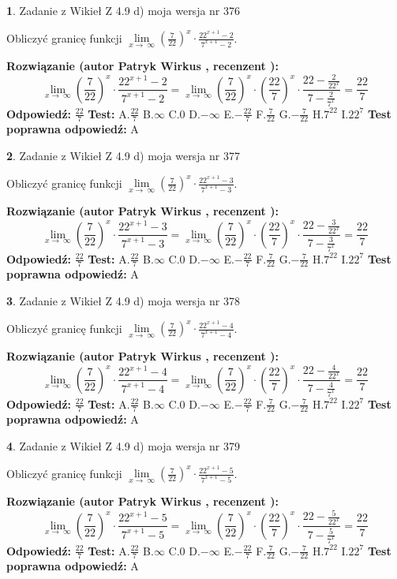 \documentclass[12pt, a4paper]{article}
\theoremstyle{definition} %
\newtheorem{zad}{}
\newcommand{\zadStart}[1]{\begin{zad}#1\newline}
\newcommand{\zadStop}{\end{zad}}
\newcommand{\rozwStart}[2]{\noindent \textbf{Rozwiązanie (autor #1 , recenzent #2): }\newline}
\newcommand{\rozwStop}{\newline}
\newcommand{\odpStart}{\noindent \textbf{Odpowiedź:}\newline}
\newcommand{\odpStop}{\newline}
\newcommand{\testStart}{\noindent \textbf{Test:}\newline}
\newcommand{\testStop}{\newline}
\newcommand{\kluczStart}{\noindent \textbf{Test poprawna odpowiedź:}\newline}
\newcommand{\kluczStop}{\newline}
\begin{document}
\zadStart{Zadanie z Wikieł Z 4.9 d) moja wersja nr 376}


Obliczyć granicę funkcji  $\lim\limits_{x\to\ \infty}(\frac{7}{22})^{x}\cdot\frac{22^{x+1}-2}{7^{x+1}-2}$.
\zadStop
\rozwStart{Patryk Wirkus}{}
$$\lim\limits_{x\to\ \infty}(\frac{7}{22})^{x}\cdot\frac{22^{x+1}-2}{7^{x+1}-2}=\lim\limits_{x\to\ \infty}(\frac{7}{22})^{x}\cdot(\frac{22}{7})^{x} \cdot \frac{22-\frac{2}{22^{x}}}{7-\frac{2}{7^{x}}} = \frac{22}{7}$$
\rozwStop
\odpStart
$\frac{22}{7}$
\odpStop
\testStart
A.$\frac{22}{7}$ B.$\infty$ C.$0$ D.$-\infty$ E.$-\frac{22}{7}$
F.$\frac{7}{22}$ G.$-\frac{7}{22}$
H.$7^{22}$
I.$22^{7}$
\testStop
\kluczStart
A
\kluczStop



\zadStart{Zadanie z Wikieł Z 4.9 d) moja wersja nr 377}


Obliczyć granicę funkcji  $\lim\limits_{x\to\ \infty}(\frac{7}{22})^{x}\cdot\frac{22^{x+1}-3}{7^{x+1}-3}$.
\zadStop
\rozwStart{Patryk Wirkus}{}
$$\lim\limits_{x\to\ \infty}(\frac{7}{22})^{x}\cdot\frac{22^{x+1}-3}{7^{x+1}-3}=\lim\limits_{x\to\ \infty}(\frac{7}{22})^{x}\cdot(\frac{22}{7})^{x} \cdot \frac{22-\frac{3}{22^{x}}}{7-\frac{3}{7^{x}}} = \frac{22}{7}$$
\rozwStop
\odpStart
$\frac{22}{7}$
\odpStop
\testStart
A.$\frac{22}{7}$ B.$\infty$ C.$0$ D.$-\infty$ E.$-\frac{22}{7}$
F.$\frac{7}{22}$ G.$-\frac{7}{22}$
H.$7^{22}$
I.$22^{7}$
\testStop
\kluczStart
A
\kluczStop



\zadStart{Zadanie z Wikieł Z 4.9 d) moja wersja nr 378}


Obliczyć granicę funkcji  $\lim\limits_{x\to\ \infty}(\frac{7}{22})^{x}\cdot\frac{22^{x+1}-4}{7^{x+1}-4}$.
\zadStop
\rozwStart{Patryk Wirkus}{}
$$\lim\limits_{x\to\ \infty}(\frac{7}{22})^{x}\cdot\frac{22^{x+1}-4}{7^{x+1}-4}=\lim\limits_{x\to\ \infty}(\frac{7}{22})^{x}\cdot(\frac{22}{7})^{x} \cdot \frac{22-\frac{4}{22^{x}}}{7-\frac{4}{7^{x}}} = \frac{22}{7}$$
\rozwStop
\odpStart
$\frac{22}{7}$
\odpStop
\testStart
A.$\frac{22}{7}$ B.$\infty$ C.$0$ D.$-\infty$ E.$-\frac{22}{7}$
F.$\frac{7}{22}$ G.$-\frac{7}{22}$
H.$7^{22}$
I.$22^{7}$
\testStop
\kluczStart
A
\kluczStop



\zadStart{Zadanie z Wikieł Z 4.9 d) moja wersja nr 379}


Obliczyć granicę funkcji  $\lim\limits_{x\to\ \infty}(\frac{7}{22})^{x}\cdot\frac{22^{x+1}-5}{7^{x+1}-5}$.
\zadStop
\rozwStart{Patryk Wirkus}{}
$$\lim\limits_{x\to\ \infty}(\frac{7}{22})^{x}\cdot\frac{22^{x+1}-5}{7^{x+1}-5}=\lim\limits_{x\to\ \infty}(\frac{7}{22})^{x}\cdot(\frac{22}{7})^{x} \cdot \frac{22-\frac{5}{22^{x}}}{7-\frac{5}{7^{x}}} = \frac{22}{7}$$
\rozwStop
\odpStart
$\frac{22}{7}$
\odpStop
\testStart
A.$\frac{22}{7}$ B.$\infty$ C.$0$ D.$-\infty$ E.$-\frac{22}{7}$
F.$\frac{7}{22}$ G.$-\frac{7}{22}$
H.$7^{22}$
I.$22^{7}$
\testStop
\kluczStart
A
\kluczStop
\end{document}
